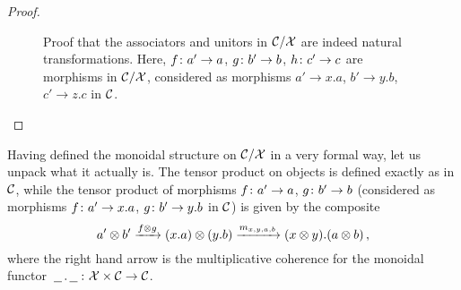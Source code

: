 \documentclass{article}
\begin{document}
\begin{proof}
\begin{figure}
    \caption[Proof that the associators and unitors in $\C/\X$ are indeed natural transformations.]{Proof that the associators and unitors in $\C/\X$ are indeed natural transformations.  
    Here, $f\colon a'\to a$, $g\colon b' \to b$, $h\colon c'\to c$ are morphisms in $\C/\X$, considered as morphisms $a'\to x.a$, $b'\to y.b$, $c'\to z.c$ in ${\mathcal{C}}$.}
    \label{FigAssocUnitorNaturalTransformations}
  \end{figure}
\end{proof}

Having defined the monoidal structure on $\C/\X$ in a very formal way, let us unpack what it actually is.  
The tensor product on objects is defined exactly as in ${\mathcal{C}}$, while the tensor product of morphisms $f\colon a' \to a$, $g \colon b' \to b$ (considered as morphisms $f \colon a' \to x.a$, $g\colon b'\to y.b$ in ${\mathcal{C}}$) is given by the composite
\[
  a'\otimes b' \xrightarrow{f\otimes g}
  (x.a) \otimes (y.b) \xrightarrow{m_{x,y,a,b}}
  (x\otimes y).(a\otimes b)\,,
  \]
where the right hand arrow is the multiplicative coherence for the monoidal functor $\,\underline{\hspace{1.5ex}}\,.\,\underline{\hspace{1.5ex}}\,\colon \mathcal X \times {\mathcal{C}} \to {\mathcal{C}}$.
\end{document}
